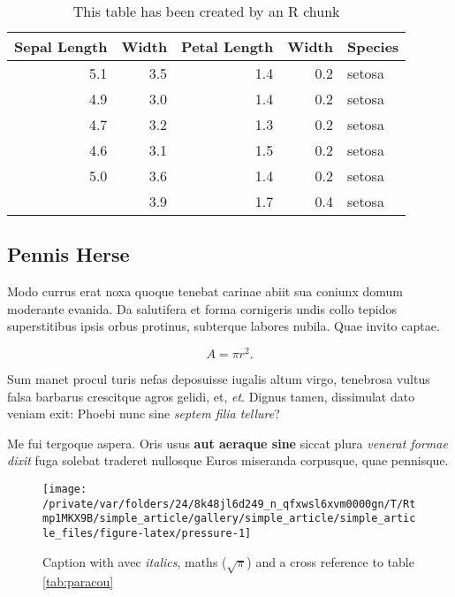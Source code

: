 \documentclass[fleqn,10pt]{article} %
\begin{document}
\scriptsize

\begin{longtable}[t]{rrrrl}
\caption{\label{tab:kable}This table has been created by an R chunk}\\
\toprule
Sepal Length & Width & Petal Length & Width & Species\\
\midrule
5.1 & 3.5 & 1.4 & 0.2 & setosa\\
4.9 & 3.0 & 1.4 & 0.2 & setosa\\
4.7 & 3.2 & 1.3 & 0.2 & setosa\\
4.6 & 3.1 & 1.5 & 0.2 & setosa\\
5.0 & 3.6 & 1.4 & 0.2 & setosa\\
\addlinespace
5.4 & 3.9 & 1.7 & 0.4 & setosa\\
\bottomrule
\end{longtable}

\normalsize

\hypertarget{pennis-herse}{%
\subsection{Pennis Herse}\label{pennis-herse}}

Modo currus erat noxa quoque tenebat carinae abiit sua coniunx domum moderante evanida.
Da salutifera et forma cornigeris undis collo tepidos superstitibus ipsis orbus protinus, subterque labores nubila.
Quae invito captae.

\begin{equation}
  A = \pi r^2.
  \label{eq:disc}
\end{equation}

Sum manet procul turis nefas deposuisse iugalis altum virgo, tenebrosa vultus falsa barbarus crescitque agros gelidi, et, \emph{et}.
Dignus tamen, dissimulat dato veniam exit: Phoebi nunc sine \emph{septem filia tellure}?

Me fui tergoque aspera.
Oris usus \textbf{aut aeraque sine} siccat plura \emph{venerat formae dixit} fuga solebat traderet nullosque Euros miseranda corpusque, quae pennisque.



\scriptsize

\begin{figure}

{\centering \texttt{[image: /private/var/folders/24/8k48jl6d249\_n\_qfxwsl6xvm0000gn/T/Rtmp1MKX9B/simple\_article/gallery/simple\_article/simple\_article\_files/figure-latex/pressure-1]} 

}

\caption{Caption with avec \emph{italics}, maths (\(\sqrt\pi\)) and a cross reference to table \ref{tab:paracou}}\label{fig:pressure}
\end{figure}
\end{document}
